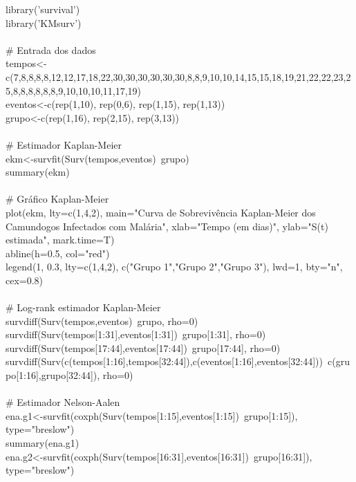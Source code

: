 \documentclass[12pt,a4paper]{article}
\begin{document}
	library('survival')\\
	library('KMsurv')\\
	\vspace{0.25cm}\\
	\# Entrada dos dados\\
	tempos<-c(7,8,8,8,8,12,12,17,18,22,30,30,30,30,30,30,8,8,9,10,10,14,15,15,18,19,21,22,22,23,25,8,8,8,8,8,8,9,10,10,10,11,17,19)\\
	eventos<-c(rep(1,10), rep(0,6), rep(1,15), rep(1,13))\\
	grupo<-c(rep(1,16), rep(2,15), rep(3,13))\\
	\vspace{0.25cm}\\
	\# Estimador Kaplan-Meier\\
	ekm<-survfit(Surv(tempos,eventos)~grupo)\\
	summary(ekm)\\
	\vspace{0.25cm}\\
	\# Gráfico Kaplan-Meier\\
	plot(ekm, lty=c(1,4,2), main="Curva de Sobrevivência Kaplan-Meier dos Camundogos Infectados com Malária", xlab="Tempo (em dias)", ylab="S(t) estimada", mark.time=T)\\
	abline(h=0.5, col="red")\\
	legend(1, 0.3, lty=c(1,4,2), c("Grupo 1","Grupo 2","Grupo 3"), lwd=1, bty="n", cex=0.8)\\
	\vspace{0.25cm}\\
	\# Log-rank estimador Kaplan-Meier\\
	survdiff(Surv(tempos,eventos)~grupo, rho=0)\\
	survdiff(Surv(tempos[1:31],eventos[1:31])~grupo[1:31], rho=0)\\
	survdiff(Surv(tempos[17:44],eventos[17:44])~grupo[17:44], rho=0)\\
	survdiff(Surv(c(tempos[1:16],tempos[32:44]),c(eventos[1:16],eventos[32:44]))~c(grupo[1:16],grupo[32:44]), rho=0)\\
	\vspace{0.25cm}\\
	\# Estimador Nelson-Aalen\\
	ena.g1<-survfit(coxph(Surv(tempos[1:15],eventos[1:15])~grupo[1:15]), type="breslow")\\
	summary(ena.g1)\\
	ena.g2<-survfit(coxph(Surv(tempos[16:31],eventos[16:31])~grupo[16:31]), type="breslow")\\
\end{document}
